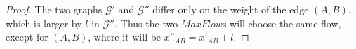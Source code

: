 \begin{proof}
  The two graphs $\mathcal{G}'$ and $\mathcal{G}''$ differ only on the weight of the edge $\left(A, B\right)$, which is
  larger by $l$ in $\mathcal{G}''$. Thus the two $MaxFlow$s will choose the same flow, except for $\left(A, B\right)$,
  where it will be $x''_{AB} = x'_{AB} + l$.
\end{proof}
